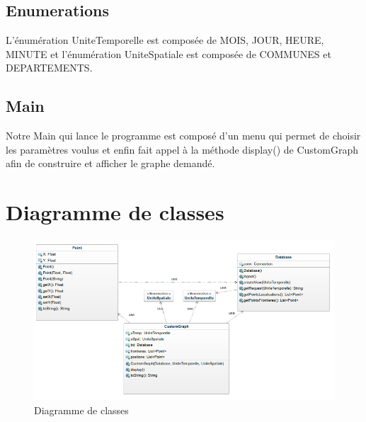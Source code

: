 \subsection{Enumerations}
 L'énumération UniteTemporelle est composée de MOIS, JOUR, HEURE, MINUTE et l'énumération UniteSpatiale est composée de COMMUNES et DEPARTEMENTS.
\subsection{Main}
  Notre Main qui lance le programme est composé d'un menu qui permet de choisir les paramètres voulus et enfin fait appel à la méthode display() de CustomGraph afin de construire et afficher le graphe demandé.
  \section{Diagramme de classes}
  \vfill
  \begin{figure}[ht!]
    \centering
     \caption{Diagramme de classes }
     \includegraphics[scale=0.5]{RO.png}
  \end{figure}
  \vfill
